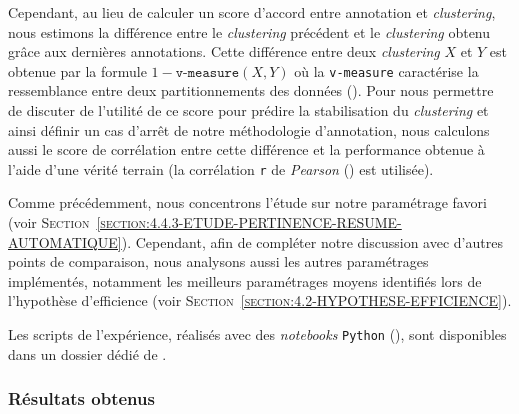 			Cependant, au lieu de calculer un score d'accord entre annotation et \textit{clustering}, nous estimons la différence entre le \textit{clustering} précédent et le \textit{clustering} obtenu grâce aux dernières annotations.
			Cette différence entre deux \textit{clustering} $X$ et $Y$ est obtenue par la formule $1-\texttt{v-measure}(X,Y)$ où la \texttt{v-measure} caractérise la ressemblance entre deux partitionnements des données (\cite{rosenberg-hirschberg:2007:vmeasure-conditional-entropybased}).
			Pour nous permettre de discuter de l'utilité de ce score pour prédire la stabilisation du \textit{clustering} et ainsi définir un cas d'arrêt de notre méthodologie d'annotation, nous calculons aussi le score de corrélation entre cette différence et la performance obtenue à l'aide d'une vérité terrain (la corrélation \texttt{r} de \textit{Pearson} (\cite{kirch:2008:pearson-correlation-coefficient}) est utilisée).
			
			\begin{leftBarIdea}
				Comme précédemment, nous concentrons l'étude sur notre paramétrage favori (voir \textsc{Section~\ref{section:4.4.3-ETUDE-PERTINENCE-RESUME-AUTOMATIQUE}}).
				Cependant, afin de compléter notre discussion avec d'autres points de comparaison, nous analysons aussi les autres paramétrages implémentés, notamment les meilleurs paramétrages moyens identifiés lors de l'hypothèse d'efficience (voir \textsc{Section~\ref{section:4.2-HYPOTHESE-EFFICIENCE}}).
			\end{leftBarIdea}
			
			\begin{leftBarInformation}
				Les scripts de l'expérience, réalisés avec des \textit{notebooks} \texttt{Python} (\cite{van-rossum-drake:2009:python-reference-manual}), sont disponibles dans un dossier dédié de \cite{schild:2021:cognitivefactory-interactiveclusteringcomparativestudy}.
			\end{leftBarInformation}

		\subsubsection{Résultats obtenus}
			
